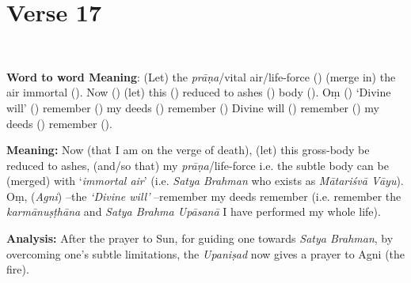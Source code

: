 \chapter{Verse 17}

\begin{moolashloka}
\\
\end{moolashloka}

\textbf{Word to word Meaning}: (Let) the \emph{prāṇa}/vital air/life-force () (merge in) the air immortal (). Now () (let) this () reduced to ashes () body (). Oṃ () `Divine will' () remember () my deeds () remember () Divine will () remember () my deeds () remember ().

\textbf{Meaning:} Now (that I am on the verge of death), (let) this gross-body be reduced to ashes, (and/so that) my \emph{prāṇa}/life-force i.e. the subtle body can be (merged) with `\emph{immortal air}' (i.e. \emph{Satya Brahman} who exists as \emph{Mātariśvā Vāyu}). Oṃ, (\emph{Agni}) --the \emph{`Divine will'} --remember my deeds remember (i.e. remember the \emph{karmānuṣṭhāna} and \emph{Satya Brahma Upāsanā} I have performed my whole life).

\textbf{Analysis:} After the prayer to Sun, for guiding one towards \emph{Satya Brahman}, by overcoming one's subtle limitations, the \emph{Upaniṣad} now gives a prayer to Agni (the fire).

